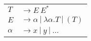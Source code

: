 \documentclass[convert={density=300,size=1080x800,outext=.png}]{standalone}
\begin{document}
\begin{tabular}{l@{ }l}
  $ T $ & $ \rightarrow E \ E^* $ \\
  $ E $ & $ \rightarrow \alpha \ | \ \lambda \alpha . T \ | \ (T) $ \\
  $ \alpha $ & $ \rightarrow x \ | \ y \ | \ \dots $
\end{tabular}
\end{document}
